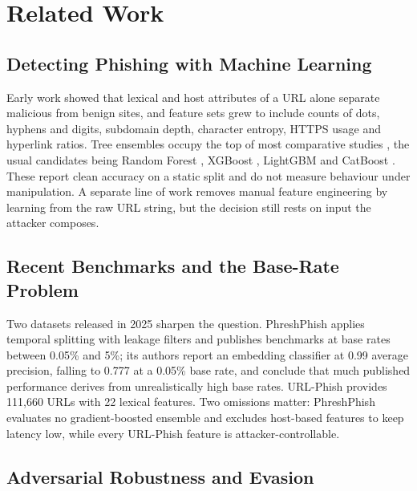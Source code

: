 \documentclass[runningheads]{llncs}
\begin{document}
\section{Related Work}
\label{sec:related}

\subsection{Detecting Phishing with Machine Learning}

Early work showed that lexical and host attributes of a URL alone separate
malicious from benign sites, and feature sets grew to include counts of dots,
hyphens and digits, subdomain depth, character entropy, HTTPS usage and
hyperlink ratios. Tree ensembles occupy the top of most comparative studies
\cite{hannousse2021}, the usual
candidates being Random Forest \cite{breiman2001}, XGBoost \cite{chen2016},
LightGBM \cite{ke2017} and CatBoost \cite{prokhorenkova2018}. These report clean
accuracy on a static split and do not measure behaviour under manipulation. A
separate line of work removes manual feature engineering by learning from the
raw URL string, but the decision still rests on input the attacker composes.

\subsection{Recent Benchmarks and the Base-Rate Problem}

Two datasets released in 2025 sharpen the question. PhreshPhish
\cite{dalton2025} applies temporal splitting with leakage filters and publishes
benchmarks at base rates between 0.05\% and 5\%; its authors report an embedding
classifier at 0.99 average precision, falling to 0.777 at a 0.05\% base rate,
and conclude that much published performance derives from unrealistically high
base rates. URL-Phish \cite{linh2025} provides 111,660 URLs with 22 lexical
features. Two omissions matter: PhreshPhish evaluates no gradient-boosted
ensemble and excludes host-based features to keep latency low, while every URL-Phish feature is attacker-controllable.

\subsection{Adversarial Robustness and Evasion}
\end{document}
